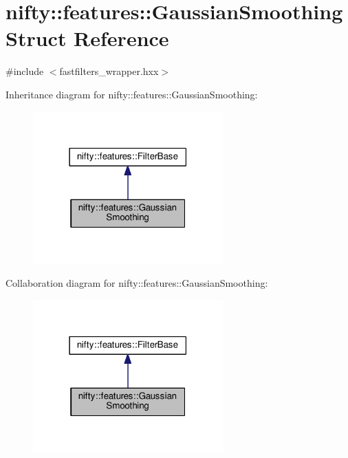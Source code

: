 \hypertarget{structnifty_1_1features_1_1GaussianSmoothing}{}\section{nifty\+:\+:features\+:\+:Gaussian\+Smoothing Struct Reference}
\label{structnifty_1_1features_1_1GaussianSmoothing}


{\ttfamily \#include $<$fastfilters\+\_\+wrapper.\+hxx$>$}



Inheritance diagram for nifty\+:\+:features\+:\+:Gaussian\+Smoothing\+:\nopagebreak
\begin{figure}[H]
\begin{center}
\leavevmode
\includegraphics[width=207pt]{structnifty_1_1features_1_1GaussianSmoothing__inherit__graph}
\end{center}
\end{figure}


Collaboration diagram for nifty\+:\+:features\+:\+:Gaussian\+Smoothing\+:\nopagebreak
\begin{figure}[H]
\begin{center}
\leavevmode
\includegraphics[width=207pt]{structnifty_1_1features_1_1GaussianSmoothing__coll__graph}
\end{center}
\end{figure}
